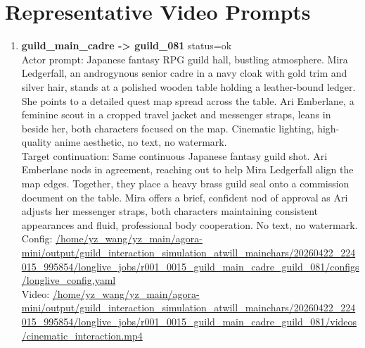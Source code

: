 \documentclass[11pt,a4paper]{article}
\begin{document}
\section{Representative Video Prompts}
\begin{enumerate}
\item \textbf{guild\_main\_cadre -> guild\_081} status=ok\\\newline Actor prompt: Japanese fantasy RPG guild hall, bustling atmosphere. Mira Ledgerfall, an androgynous senior cadre in a navy cloak with gold trim and silver hair, stands at a polished wooden table holding a leather-bound ledger. She points to a detailed quest map spread across the table. Ari Emberlane, a feminine scout in a cropped travel jacket and messenger straps, leans in beside her, both characters focused on the map. Cinematic lighting, high-quality anime aesthetic, no text, no watermark.\\\newline Target continuation: Same continuous Japanese fantasy guild shot. Ari Emberlane nods in agreement, reaching out to help Mira Ledgerfall align the map edges. Together, they place a heavy brass guild seal onto a commission document on the table. Mira offers a brief, confident nod of approval as Ari adjusts her messenger straps, both characters maintaining consistent appearances and fluid, professional body cooperation. No text, no watermark.\\\newline Config: \url{/home/yz\_wang/yz\_main/agora-mini/output/guild\_interaction\_simulation\_atwill\_mainchars/20260422\_224015\_995854/longlive\_jobs/r001\_0015\_guild\_main\_cadre\_guild\_081/configs/longlive\_config.yaml}\\\newline Video: \url{/home/yz\_wang/yz\_main/agora-mini/output/guild\_interaction\_simulation\_atwill\_mainchars/20260422\_224015\_995854/longlive\_jobs/r001\_0015\_guild\_main\_cadre\_guild\_081/videos/cinematic\_interaction.mp4}

\end{enumerate}
\end{document}
